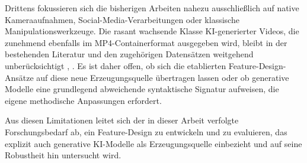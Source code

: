 Drittens fokussieren sich die bisherigen Arbeiten nahezu ausschließlich auf native Kameraaufnahmen, Social-Media-Verarbeitungen oder klassische Manipulationswerkzeuge. Die rasant wachsende Klasse KI-generierter Videos, die zunehmend ebenfalls im MP4-Containerformat ausgegeben wird, bleibt in der bestehenden Literatur und den zugehörigen Datensätzen weitgehend unberücksichtigt \cite[Kap. 1]{shullani_vision_2017}, \cite[Kap. 1]{yang_efficient_2020}. Es ist daher offen, ob sich die etablierten Feature-Design-Ansätze auf diese neue Erzeugungsquelle übertragen lassen oder ob generative Modelle eine grundlegend abweichende syntaktische Signatur aufweisen, die eigene methodische Anpassungen erfordert.

Aus diesen Limitationen leitet sich der in dieser Arbeit verfolgte Forschungsbedarf ab, ein Feature-Design zu entwickeln und zu evaluieren, das explizit auch generative KI-Modelle als Erzeugungsquelle einbezieht und auf seine Robustheit hin untersucht wird.